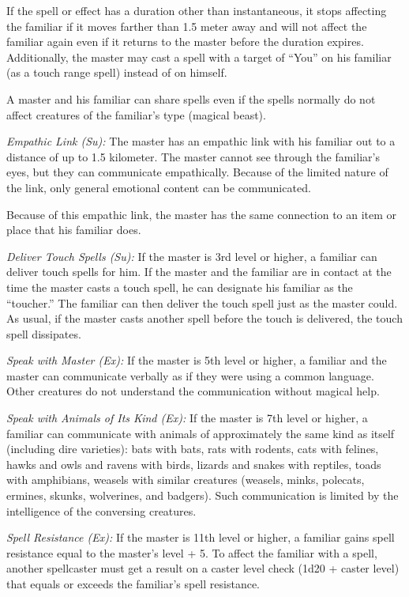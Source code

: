 If the spell or effect has a duration other than instantaneous, it stops affecting the familiar if it moves farther than 1.5 meter away and will not affect the familiar again even if it returns to the master before the duration expires. Additionally, the master may cast a spell with a target of ``You'' on his familiar (as a touch range spell) instead of on himself.

A master and his familiar can share spells even if the spells normally do not affect creatures of the familiar's type (magical beast).

\textit{Empathic Link (Su):} The master has an empathic link with his familiar out to a distance of up to 1.5 kilometer. The master cannot see through the familiar's eyes, but they can communicate empathically. Because of the limited nature of the link, only general emotional content can be communicated.

Because of this empathic link, the master has the same connection to an item or place that his familiar does.

\textit{Deliver Touch Spells (Su):} If the master is 3rd level or higher, a familiar can deliver touch spells for him. If the master and the familiar are in contact at the time the master casts a touch spell, he can designate his familiar as the ``toucher.'' The familiar can then deliver the touch spell just as the master could. As usual, if the master casts another spell before the touch is delivered, the touch spell dissipates.

\textit{Speak with Master (Ex):} If the master is 5th level or higher, a familiar and the master can communicate verbally as if they were using a common language. Other creatures do not understand the communication without magical help.

\textit{Speak with Animals of Its Kind (Ex):} If the master is 7th level or higher, a familiar can communicate with animals of approximately the same kind as itself (including dire varieties): bats with bats, rats with rodents, cats with felines, hawks and owls and ravens with birds, lizards and snakes with reptiles, toads with amphibians, weasels with similar creatures (weasels, minks, polecats, ermines, skunks, wolverines, and badgers). Such communication is limited by the intelligence of the conversing creatures.

\textit{Spell Resistance (Ex):} If the master is 11th level or higher, a familiar gains spell resistance equal to the master's level + 5. To affect the familiar with a spell, another spellcaster must get a result on a caster level check (1d20 + caster level) that equals or exceeds the familiar's spell resistance.

